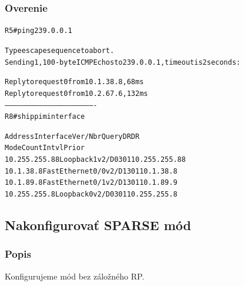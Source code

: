 \documentclass[12pt,twoside,a4paper]{report}
\begin{document}
\subsubsection{Overenie}

\noindent
{\selectfont
\begin{small}
\begin{alltt}
R5#ping 239.0.0.1

Type escape sequence to abort.
Sending 1, 100-byte ICMP Echos to 239.0.0.1, timeout is 2 seconds:

Reply to request 0 from 10.1.38.8, 68 ms
Reply to request 0 from 10.2.67.6, 132 ms
----------------------------------------------------------------
R8#sh ip pim interface

Address          Interface         Ver/   Nbr    Query  DR     DR
                                   Mode   Count  Intvl  Prior
10.255.255.88    Loopback1         v2/D   0      30     1      10.255.255.88
10.1.38.8        FastEthernet0/0   v2/D   1      30     1      10.1.38.8
10.1.89.8        FastEthernet0/1   v2/D   1      30     1      10.1.89.9
10.255.255.8     Loopback0         v2/D   0      30     1      10.255.255.8

\end{alltt}
\end{small}
}

\subsection{Nakonfigurovať SPARSE mód}
\subsubsection{Popis}
Konfigurujeme  mód bez záložného RP.
\end{document}
